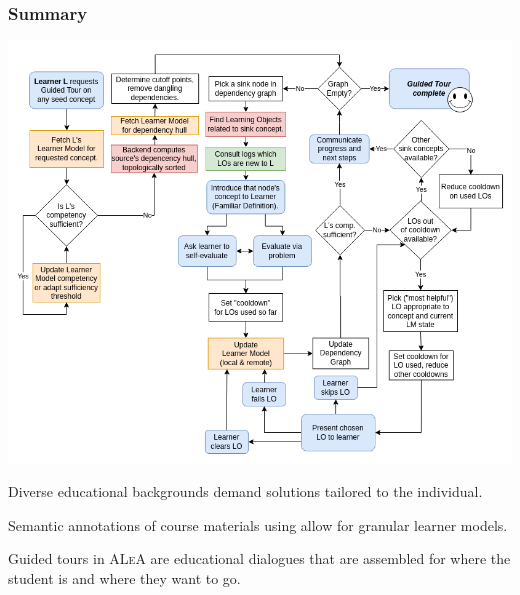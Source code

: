 \documentclass[aspectratio=169, usenames, dvipsnames]{beamer}
\def\ALeA{\textsc{ALeA}\xspace}
\begin{document}
\begin{frame}
\frametitle{Summary}
\begin{minipage}{0.7\textwidth}
\vspace*{-10px}
\includegraphics[height=0.9\textheight,keepaspectratio]{images/gt_algorithm_square}
\end{minipage}%
\begin{minipage}{0.3\textwidth}
Diverse educational backgrounds demand solutions tailored to the individual.\bigskip

Semantic annotations of course materials using \sTeX allow for granular learner models.\bigskip

Guided tours in \ALeA are educational dialogues that are assembled for where the student is and where they want to go.
\end{minipage}%
\end{frame}
\end{document}

